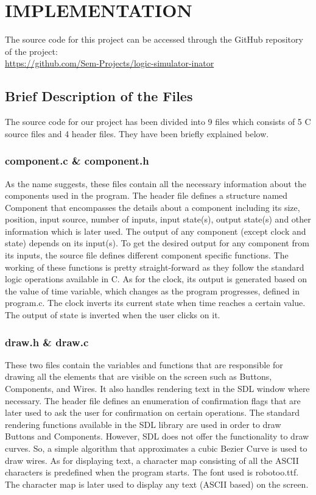 \documentclass[report]{subfiles}
\begin{document}
    \chapter{IMPLEMENTATION}
    The source code for this project can be accessed through the GitHub repository of the project:\\
    \url{https://github.com/Sem-Projects/logic-simulator-inator}
    \section{Brief Description of the Files}
    The source code for our project has been divided into 9 files which consists of 5 C source files and 4 header files. They have been briefly explained below.
    \subsection{component.c \& component.h}
    As the name suggests, these files contain all the necessary information about the components used in the program. The header file defines a structure named Component that encompasses the details about a component including its size, position, input source, number of inputs, input state(s), output state(s) and other information which is later used.
    The output of any component (except clock and state) depends on its input(s). To get the desired output for any component from its inputs, the source file defines different component specific functions. The working of these functions is pretty straight-forward as they follow the standard logic operations available in C. As for the clock, its output is generated based on the value of time variable, which changes as the program progresses, defined in program.c. The clock inverts its current state when time reaches a certain value. The output of state is inverted when the user clicks on it.
    \subsection{draw.h \& draw.c}
    These two files contain the variables and functions that are responsible for drawing all the elements that are visible on the screen such as Buttons, Components, and Wires. It also handles rendering text in the SDL window where necessary. The header file defines an enumeration of confirmation flags that are later used to ask the user for confirmation on certain operations.
    The standard rendering functions available in the SDL library are used in order to draw Buttons and Components. However, SDL does not offer the functionality to draw curves. So, a simple algorithm that approximates a cubic Bezier Curve is used to draw wires.
    As for displaying text, a character map consisting of all the ASCII characters is predefined when the program starts. The font used is robotoo.ttf. The character map is later used to display any text (ASCII based) on the screen.
\end{document}
